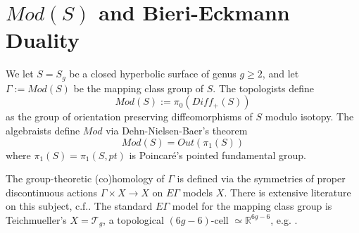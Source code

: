 \documentclass[12pt]{amsart}
\theoremstyle{definition}
\theoremstyle{remark}
\newcommand{\bR}{\mathbb{R}}
\newcommand{\sT}{\mathscr{T}}
\newcommand{\sZ}{\mathscr{Z}}
\begin{document}



\section{$Mod(S)$ and Bieri-Eckmann Duality}

We let $S=S_g$ be a closed hyperbolic surface of genus $g \geq 2$, and let $\Gamma:=Mod(S)$ be the mapping class group of $S$. The topologists define $$Mod(S):=\pi_0(Diff_+(S))$$ as the group of orientation preserving diffeomorphisms of $S$ modulo isotopy. The algebraists define $Mod$ via Dehn-Nielsen-Baer's theorem $$Mod(S)=Out(\pi_1(S))$$ where $\pi_1(S)=\pi_1(S, pt)$ is Poincar\'e's pointed fundamental group.
 
 
 








The group-theoretic (co)homology of $\Gamma$ is defined via the symmetries of proper discontinuous actions $\Gamma \times X \to X$ on $E\Gamma$ models $X$. There is extensive literature on this subject, c.f.\cite{Brown}. The standard $E\Gamma$ model for the mapping class group is Teichmueller's $X=\sT_g$, a topological $(6g-6)$-cell $\simeq \bR^{6g-6}$, e.g. \cite{hubbard}. %
\end{document}
